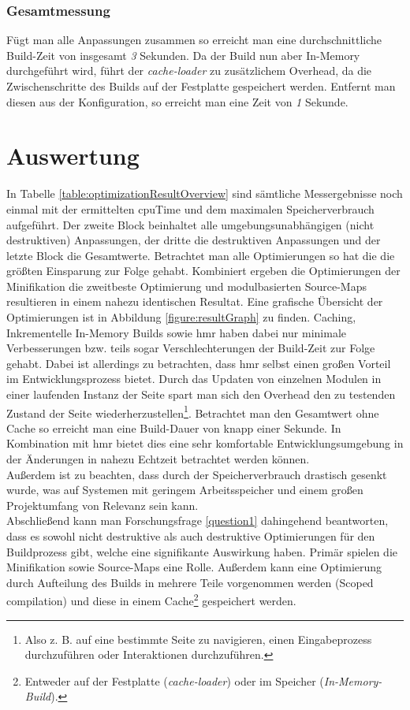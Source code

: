 \documentclass[11pt]{report}
\begin{document}
			\subsection{Gesamtmessung}
				Fügt man alle Anpassungen zusammen so erreicht man eine durchschnittliche Build-Zeit von insgesamt \emph{3} Sekunden. Da der Build nun aber In-Memory durchgeführt wird, führt der \emph{cache-loader} zu zusätzlichem Overhead, da die Zwischenschritte des Builds auf der Festplatte gespeichert werden. Entfernt man diesen aus der Konfiguration, so erreicht man eine Zeit von \emph{1} Sekunde.

	\chapter{Auswertung}
		In Tabelle \ref{table:optimizationResultOverview} sind sämtliche Messergebnisse noch einmal mit der ermittelten \Gls{cpuTime} und dem maximalen Speicherverbrauch aufgeführt. Der zweite Block beinhaltet alle umgebungsunabhängigen (nicht destruktiven) Anpassungen, der dritte die destruktiven Anpassungen und der letzte Block die Gesamtwerte. Betrachtet man alle Optimierungen so hat die  die größten Einsparung zur Folge gehabt. Kombiniert ergeben die Optimierungen der Minifikation die zweitbeste Optimierung und modulbasierten Source-Maps resultieren in einem nahezu identischen Resultat. Eine grafische Übersicht der Optimierungen ist in Abbildung \ref{figure:resultGraph} zu finden. Caching, Inkrementelle In-Memory Builds sowie \Gls{hmr} haben dabei nur minimale Verbesserungen bzw. teils sogar Verschlechterungen der Build-Zeit zur Folge gehabt. Dabei ist allerdings zu betrachten, dass \Gls{hmr} selbst einen großen Vorteil im Entwicklungsprozess bietet. Durch das Updaten von einzelnen Modulen in einer laufenden Instanz der Seite spart man sich den Overhead den zu testenden Zustand der Seite wiederherzustellen\footnote{Also z. B. auf eine bestimmte Seite zu navigieren, einen Eingabeprozess durchzuführen oder Interaktionen durchzuführen.}. Betrachtet man den Gesamtwert ohne Cache so erreicht man eine Build-Dauer von knapp einer Sekunde. In Kombination mit \Gls{hmr} bietet dies eine sehr komfortable Entwicklungsumgebung in der Änderungen in nahezu Echtzeit betrachtet werden können.\\
		Außerdem ist zu beachten, dass durch  der Speicherverbrauch drastisch gesenkt wurde, was auf Systemen mit geringem Arbeitsspeicher und einem großen Projektumfang von Relevanz sein kann.\\
		Abschließend kann man Forschungsfrage \ref{question1} dahingehend beantworten, dass es sowohl nicht destruktive als auch destruktive Optimierungen für den Buildprozess gibt, welche eine signifikante Auswirkung haben. Primär spielen die Minifikation sowie Source-Maps eine Rolle. Außerdem kann eine Optimierung durch Aufteilung des Builds in mehrere Teile vorgenommen werden (Scoped compilation) und diese in einem Cache\footnote{Entweder auf der Festplatte (\emph{cache-loader}) oder im Speicher (\emph{In-Memory-Build}).} gespeichert werden.
		
\end{document}
